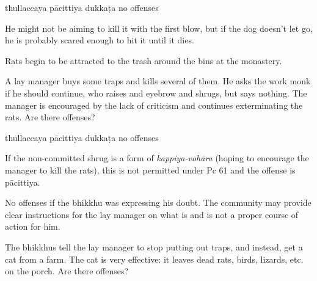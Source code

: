 \begin{exam}{\autoExamName}
\begin{problem*}
\begin{parts}
    \bigskip

    \begin{answers}{4}
      \bChoices
       thullaccaya \eAns
       pācittiya\eAns
       dukkaṭa\eAns
       no offenses\eAns
      \eChoices
    \end{answers}

    \begin{solution}
      He might not be aiming to kill it with the first blow, but if the dog doesn't let go, he is probably scared enough to hit it until it dies.
    \end{solution}

  \end{parts}

\end{problem*}

\problemDivide

\begin{problem*}

  Rats begin to be attracted to the trash around the bins at the monastery.


  \begin{parts}

    \item A lay manager buys some traps and kills several of them. He asks the work monk if he should continue, who raises and eyebrow and shrugs, but says nothing. The manager is encouraged by the lack of criticism and continues exterminating the rats. Are there offenses?

    \bigskip

    \begin{answers}{4}
      \bChoices
       thullaccaya \eAns
       pācittiya\eAns
       dukkaṭa\eAns
       no offenses\eAns
      \eChoices
    \end{answers}

    \begin{solution}
      If the non-committed shrug is a form of \emph{kappiya-vohāra} (hoping to encourage the manager to kill the rats), this is not permitted under Pc 61 and the offense is pācittiya.

      No offenses if the bhikkhu was expressing his doubt.
      The community may provide clear instructions for the lay manager on what is and is not a proper course of action for him.
    \end{solution}

    \bigskip

    \item The bhikkhus tell the lay manager to stop putting out traps, and instead, get a cat from a farm. The cat is very effective: it leaves dead rats, birds, lizards, etc. on the porch. Are there offenses?


\end{parts}
\end{problem*}
\end{exam}
